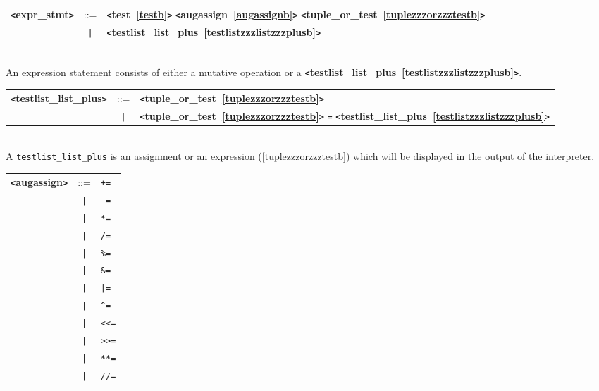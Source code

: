 \label{exprzzzstmtb}
\begin{tabular}{lcl}
{\bf \verb+<+expr\_stmt\verb+>+} & ::=  & {\bf \verb+<+test~\ref{testb}\verb+>+}  {\bf \verb+<+augassign~\ref{augassignb}\verb+>+}  {\bf \verb+<+tuple\_or\_test~\ref{tuplezzzorzzztestb}\verb+>+}  \\
 & \verb+|+  & {\bf \verb+<+testlist\_list\_plus~\ref{testlistzzzlistzzzplusb}\verb+>+}  \\
\end{tabular} \\

An expression statement consists of either a mutative operation or a {\bf \verb+<+testlist\_list\_plus~\ref{testlistzzzlistzzzplusb}\verb+>+}.

\label{testlistzzzlistzzzplusb}
\begin{tabular}{lcl}
{\bf \verb+<+testlist\_list\_plus\verb+>+} & ::=  & {\bf \verb+<+tuple\_or\_test~\ref{tuplezzzorzzztestb}\verb+>+}  \\
 & \verb+|+  & {\bf \verb+<+tuple\_or\_test~\ref{tuplezzzorzzztestb}\verb+>+}  \verb|=| {\bf \verb+<+testlist\_list\_plus~\ref{testlistzzzlistzzzplusb}\verb+>+}  \\
\end{tabular} \\

A \verb|testlist_list_plus| is an assignment or an expression (\ref{tuplezzzorzzztestb}) which will be displayed in the output of the interpreter.

\label{augassignb}
\begin{tabular}{lcl}
{\bf \verb+<+augassign\verb+>+} & ::=  & \verb|+=| \\
 & \verb+|+  & \verb|-=| \\
 & \verb+|+  & \verb|*=| \\
 & \verb+|+  & \verb|/=| \\
 & \verb+|+  & \verb|%=| \\
 & \verb+|+  & \verb|&=| \\
 & \verb+|+  & \verb+|=+ \\
 & \verb+|+  & \verb|^=| \\
 & \verb+|+  & \verb|<<=| \\
 & \verb+|+  & \verb|>>=| \\
 & \verb+|+  & \verb|**=| \\
 & \verb+|+  & \verb|//=| \\
\end{tabular}

